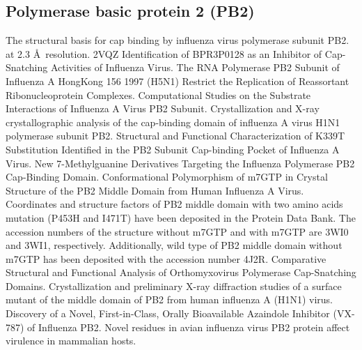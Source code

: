 
\subsection{Polymerase basic protein 2 (PB2)}


\citep{1192} The structural basis for cap binding by influenza virus polymerase subunit PB2. at 2.3 \AA\ resolution. 2VQZ
\citep{1236} Identification of BPR3P0128 as an Inhibitor of Cap-Snatching Activities of Influenza Virus.%
\citep{1552} The RNA Polymerase PB2 Subunit of Influenza A HongKong 156 1997 (H5N1) Restrict the Replication of Reassortant Ribonucleoprotein Complexes.%
\citep{1553} Computational Studies on the Substrate Interactions of Influenza A Virus PB2 Subunit.%
\citep{1551} Crystallization and X-ray crystallographic analysis of the cap-binding domain of influenza A virus H1N1 polymerase subunit PB2.%
\citep{1554} Structural and Functional Characterization of K339T Substitution Identified in the PB2 Subunit Cap-binding Pocket of Influenza A Virus.%
\citep{1557} New 7-Methylguanine Derivatives Targeting the Influenza Polymerase PB2 Cap-Binding Domain.%
\citep{1546} Conformational Polymorphism of m7GTP in Crystal Structure of the PB2 Middle Domain from Human Influenza A Virus. Coordinates and structure factors of PB2 middle domain with two amino acids mutation (P453H and I471T) have been deposited in the Protein Data Bank. The accession numbers of the structure without m7GTP and with m7GTP are 3WI0 and 3WI1, respectively. Additionally, wild type of PB2 middle domain without m7GTP has been deposited with the accession number 4J2R.%
\citep{1560} Comparative Structural and Functional Analysis of Orthomyxovirus Polymerase Cap-Snatching Domains.%
\citep{1555} Crystallization and preliminary X-ray diffraction studies of a surface mutant of the middle domain of PB2 from human influenza A (H1N1) virus.%
\citep{1558} Discovery of a Novel, First-in-Class, Orally Bioavailable Azaindole Inhibitor (VX-787) of Influenza PB2.%
\citep{1556} Novel residues in avian influenza virus PB2 protein affect virulence in mammalian hosts.%


